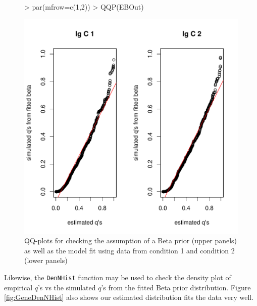 \documentclass{article}
\begin{document}
\begin{figure}[h!]
\centering
\begin{Schunk}
\begin{Sinput}
> par(mfrow=c(1,2))
> QQP(EBOut)
\end{Sinput}
\end{Schunk}
\includegraphics{EBSeq_Vignette-023}
\caption{QQ-plots for checking the assumption of a Beta prior (upper panels) as well as the
model fit using data from condition 1 and condition 2 (lower panels)}
\label{fig:GeneQQ}
\end{figure}

\newpage
\noindent  
Likewise, the \verb+DenNHist+ function may be used to check the density plot of empirical $q$'s vs the simulated
$q$'s from the fitted Beta prior distribution. 
Figure \ref{fig:GeneDenNHist} also shows our estimated distribution fits the 
data very well.
\end{document}
